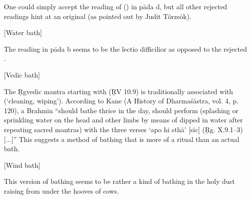 { One could simply accept the reading of \msCc () in pāda d, but all other rejected                  readings hint at an original  (as pointed out by Judit Törzsök). }




\begin{center}{{[Water bath]}}\end{center}




{ The reading  in pāda b seems to be the lectio difficilior as opposed to                 the rejected . }




\begin{center}{{[Vedic bath]}}\end{center}




{ The Ṛgvedic mantra starting with  (ṚV 10.9) is traditionally associated with                   (`cleaning, wiping'). According to Kane (A History of Dharmaśāstra, vol. 4, p. 120),                 a Brahmin ``should bathe thrice in the day, should perform  (splashing                 or sprinkling water on the head and other limbs by means of                   dipped in water after repeating sacred mantras) with the three verses `apo hi sthā' [sic] (Ṛg. X.9.1--3) [...]''                 This suggests a method of bathing that is more of a ritual than an actual bath. }




\begin{center}{{[Wind bath]}}\end{center}




{ This version of bathing seems to be rather a kind of bathing                  in the holy dust raising from under the hooves of cows. }




